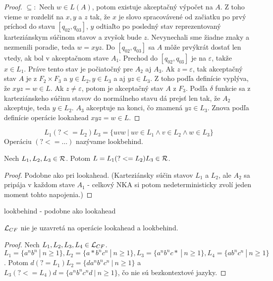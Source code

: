 \begin{proof}
$ \subseteq: $ Nech $w \in L(A)$, potom existuje akceptačný výpočet na $A$. Z toho vieme $w$ rozdeliť na $x,y$ a $z$ tak, že $x$ je slovo spracovávené od začiatku po prvý príchod do stavu $\left[q_{02},q_{03}\right]$, $y$ odtiaľto po posledný stav reprezentovaný karteziánskym súčinom stavov a zvyšok bude $z$. Nevynechali sme žiadne znaky a nezmenili poradie, teda $w=xyz$. Do $\left[q_{02},q_{03}\right]$ sa $A$ môže prvýkrát dostať len vtedy, ak bol v akceptačnom stave $A_1$. Prechod do $\left[q_{02},q_{03}\right]$ je na $\varepsilon$, takže $x \in L_1$. Práve tento stav je počiatočný pre $A_2$ aj $A_3$. Ak $z=\varepsilon$, tak akceptačný stav $A$ je z $F_2\times F_3$ a $y \in L_2, y \in L_3$ a aj $yz \in L_3$. Z toho podľa definície vyplýva, že $xyz=w \in L$. Ak $z\neq \varepsilon$, potom je akceptačný stav $A$ z $F_3$. Podľa $\delta$ funkcie sa z karteziánskeho súčinu stavov do normálneho stavu dá prejsť len tak, že $A_2$ akceptuje, teda $y \in L_2$. $A_3$ akceptuje na konci, čo znamená $yz \in L_3$. Znova podľa definície operácie lookahead $xyz=w \in L$.
\end{proof}

\begin{df}[Lookbehind]
$$ L_{1}(?<=L_{2})L_{3} = \lbrace uvw ~|~ uv \in L_{1} \land v \in L_{2} \land w \in L_{3} \rbrace $$ Operáciu $(?<=\dots)$ nazývame lookbehind.
\end{df}

\begin{veta}
Nech $ L_{1}, L_{2}, L_{3} \in {\cal R} $. Potom $ L = L_{1}(?<=L_{2})L_{3} \in {\cal R} $.
\end{veta}
\begin{proof}
Podobne ako pri lookahead. (Karteziánsky súčin stavov $L_1$ a $L_2$, ale $A_2$ sa pripája v každom stave $A_1$ - celkový NKA si potom nedeterministicky zvolí jeden moment tohto napojenia.)
\end{proof}


\todo lookbehind - podobne ako lookahead

\begin{veta}
$ {\cal L}_{CF} $ nie je uzavretá na operácie lookahead a lookbehind.
\end{veta}
\begin{proof}
Nech $ L_{1}, L_{2}, L_{3}, L_4 \in {\cal L}_{CF} $. $ L_1 = \lbrace a^nb^n ~|~ n\geq 1 \rbrace , L_2 = \lbrace a*b^nc^n ~|~ n\geq 1\rbrace , L_3 = \lbrace a^nb^nc* ~|~ n \geq 1\rbrace, L_4 = \lbrace ab^nc^n ~|~ n \geq 1 \rbrace$. Potom $ d(?=L_1)L_2 = \lbrace da^nb^nc^n ~|~ n\geq 1 \rbrace $ a $ L_3(?<=L_4)d = \lbrace a^nb^nc^nd ~|~ n\geq 1 \rbrace$, čo nie sú bezkontextové jazyky.
\end{proof}

